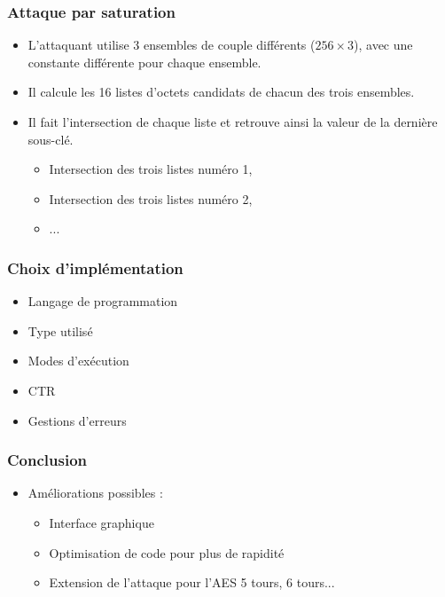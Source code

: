 \documentclass{beamer}
\begin{document}
	\begin{frame}
		\frametitle{Attaque par saturation}
		\begin{itemize}
			\item L'attaquant utilise 3 ensembles de couple différents ($256 \times 3$), avec une constante différente pour chaque ensemble.
			\item Il calcule les 16 listes d'octets candidats de chacun des trois ensembles.
   			\item Il fait l'intersection de chaque liste et retrouve ainsi la valeur de la dernière sous-clé.
			\begin{itemize}
				\item Intersection des trois listes numéro 1,
				\item Intersection des trois listes numéro 2,
				\item ...
			\end{itemize}
		\end{itemize}
	\end{frame}

	\begin{frame}
		\frametitle{Choix d'implémentation}
		\begin{itemize}
			\item Langage de programmation
			\item Type utilisé
			\item Modes d'exécution
			\item CTR
			\item Gestions d'erreurs
		\end{itemize}
	\end{frame}

	\begin{frame}
		\frametitle{Conclusion}
		\begin{itemize}
			\item Améliorations possibles :
			\begin{itemize}
				\item Interface graphique
    			\item Optimisation de code pour plus de rapidité
       			\item Extension de l'attaque pour l'AES 5 tours, 6 tours...
			\end{itemize}
		\end{itemize}
	\end{frame}
\end{document}
